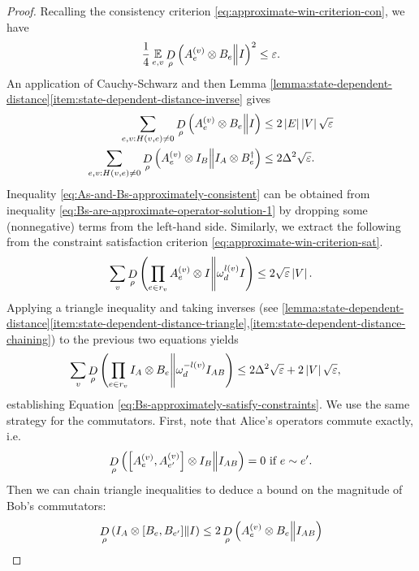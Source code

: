 \begin{proof}
	Recalling the consistency criterion \eqref{eq:approximate-win-criterion-con}, we have 
	\begin{align}
		\frac14\operatorname*{\mathbb E}\limits_{e,v}\mathop{D}\limits_{\rho}\left(A_e^{(v)}\otimes B_e\middle\| I\right)^2 \leq \varepsilon.
	\end{align}
	An application of Cauchy-Schwarz 
	and then Lemma \ref{lemma:state-dependent-distance}\eqref{item:state-dependent-distance-inverse} 
	gives
	\begin{align}
		\sum_{e,v:H(v,e)\neq 0} \mathop{D}\limits_{\rho}\left(A_e^{(v)}\otimes B_e\middle\| I\right) 
		&\leq 2 \left\vert E\right\vert \left\vert V\right\vert\sqrt{\varepsilon} \nonumber
		\\
		\sum_{e,v:H(v,e)\neq 0} \mathop{D}\limits_{\rho}\left(A_e^{(v)}\otimes I_B\middle\| I_A\otimes B_e^\dagger\right)
		 &\leq 2 \Delta^2\sqrt{\varepsilon}. \label{eq:Bs-are-approximate-operator-solution-1}
	\end{align}
	Inequality \eqref{eq:As-and-Bs-approximately-consistent} can be obtained from inequality \eqref{eq:Bs-are-approximate-operator-solution-1} by dropping some (nonnegative) terms from the left-hand side.
	Similarly, we extract the following from the constraint satisfaction criterion \eqref{eq:approximate-win-criterion-sat}.
	\begin{align}
	\label{eq:Bs-are-approximate-operator-solution-2}
		\sum_v \mathop{D}\limits_{\rho}\left(
		\prod_{e\in r_v} A_e^{(v)} \otimes I\middle\| \omega_d^{l(v)}I\right)
		\leq 2 \sqrt {\varepsilon} \left\vert V\right\vert.
	\end{align}
	Applying a triangle inequality and taking inverses (see \ref{lemma:state-dependent-distance}\ref{item:state-dependent-distance-triangle},\ref{item:state-dependent-distance-chaining}) to the previous two equations yields
	\begin{align}
		\sum_v \mathop{D}\limits_{\rho}\left(
		\prod_{e\in r_v} I_A\otimes B_e\middle\| \omega_d^{-l(v)}I_{AB}\right) 
		&\leq 2\Delta^2\sqrt{\varepsilon} +2 \left\vert V\right\vert\sqrt{\varepsilon}
		,
	\end{align}
	establishing Equation \eqref{eq:Bs-approximately-satisfy-constraints}. 
	We use the same strategy for the commutators. First, note that Alice's operators commute exactly, i.e.\
	\begin{equation}
	\label{eq:Bs-are-approximate-operator-solution-3}
	\mathop{D}\limits_{\rho}\left(\left[A_e^{(v)}, A_{e'}^{(v)}\right]\otimes I_B\middle\| I_{AB}\right) 
	= 0\text{ if }e\sim e'.
	\end{equation}
	Then we can chain triangle inequalities to deduce a bound on the magnitude of Bob's commutators:
	\begin{equation}
	\drho{\rho}{I_A\otimes \left[B_e,B_{e'}\right]}{I}
	\leq 
	2\drho{\rho}{A_e^{(v)}\otimes B_e}{I_{AB}}

\end{equation}
\end{proof}
